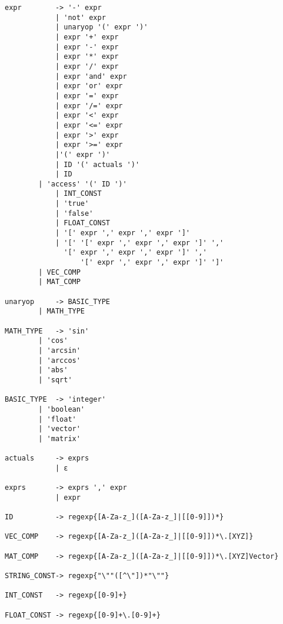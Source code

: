 \begin{lstlisting}
expr        -> '-' expr	
            | 'not' expr		
            | unaryop '(' expr ')'	
            | expr '+' expr		
            | expr '-' expr		
            | expr '*' expr	
            | expr '/' expr	
            | expr 'and' expr		
            | expr 'or' expr		
            | expr '=' expr			
            | expr '/=' expr			
            | expr '<' expr			
            | expr '<=' expr			
            | expr '>' expr			
            | expr '>=' expr			
            |'(' expr ')'				
            | ID '(' actuals ')'			
            | ID					
	    | 'access' '(' ID ')'			
            | INT_CONST					
            | 'true'
            | 'false'				
            | FLOAT_CONST					
            | '[' expr ',' expr ',' expr ']' 
            | '[' '[' expr ',' expr ',' expr ']' ',' 
	          '[' expr ',' expr ',' expr ']' ',' 
                  '[' expr ',' expr ',' expr ']' ']' 			
	    | VEC_COMP								
	    | MAT_COMP							

unaryop	    -> BASIC_TYPE			
	    | MATH_TYPE		
	       
MATH_TYPE   -> 'sin'
	    | 'cos'
	    | 'arcsin'
	    | 'arccos'
	    | 'abs'
	    | 'sqrt'
	    
BASIC_TYPE  -> 'integer'
	    | 'boolean'
	    | 'float'
	    | 'vector'
	    | 'matrix'

actuals     -> exprs	
            | ε	

exprs       -> exprs ',' expr	
            | expr		

ID          -> regexp{[A-Za-z_]([A-Za-z_]|[[0-9]])*}

VEC_COMP    -> regexp{[A-Za-z_]([A-Za-z_]|[[0-9]])*\.[XYZ]}         

MAT_COMP    -> regexp{[A-Za-z_]([A-Za-z_]|[[0-9]])*\.[XYZ]Vector}

STRING_CONST-> regexp{"\""([^\"])*"\""}

INT_CONST   -> regexp{[0-9]+}

FLOAT_CONST -> regexp{[0-9]+\.[0-9]+}

\end{lstlisting}